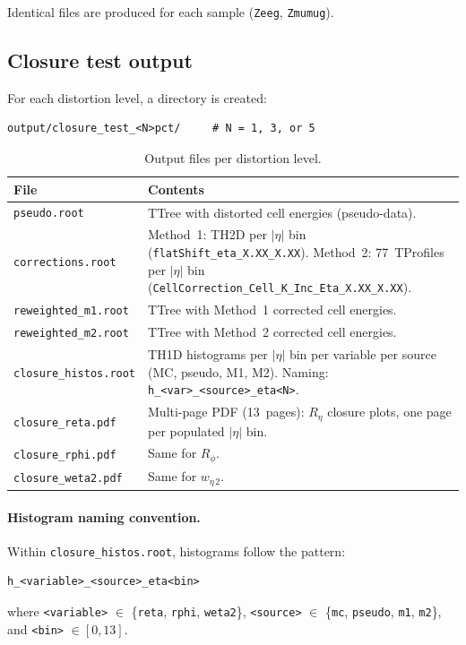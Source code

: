 \documentclass[12pt,a4paper]{article}
\begin{document}
Identical files are produced for each sample (\texttt{Zeeg},
\texttt{Zmumug}).

\subsection{Closure test output}

For each distortion level, a directory is created:

\begin{lstlisting}
output/closure_test_<N>pct/     # N = 1, 3, or 5
\end{lstlisting}

\begin{table}[htbp]
\centering
\caption{Output files per distortion level.}
\label{tab:output:closure}
\small
\begin{tabular}{lp{8cm}}
\toprule
\textbf{File} & \textbf{Contents} \\
\midrule
\texttt{pseudo.root}
  & TTree with distorted cell energies (pseudo-data). \\
\texttt{corrections.root}
  & Method~1: TH2D per $|\eta|$ bin
    (\texttt{flatShift\_eta\_X.XX\_X.XX}).
    Method~2: 77~TProfiles per $|\eta|$ bin
    (\texttt{CellCorrection\_Cell\_K\_Inc\_Eta\_X.XX\_X.XX}). \\
\texttt{reweighted\_m1.root}
  & TTree with Method~1 corrected cell energies. \\
\texttt{reweighted\_m2.root}
  & TTree with Method~2 corrected cell energies. \\
\texttt{closure\_histos.root}
  & TH1D histograms per $|\eta|$ bin per variable per source
    (MC, pseudo, M1, M2). Naming:
    \texttt{h\_<var>\_<source>\_eta<N>}. \\
\texttt{closure\_reta.pdf}
  & Multi-page PDF (13~pages): $R_\eta$ closure plots,
    one page per populated $|\eta|$ bin. \\
\texttt{closure\_rphi.pdf}
  & Same for $R_\phi$. \\
\texttt{closure\_weta2.pdf}
  & Same for $w_{\eta\,2}$. \\
\bottomrule
\end{tabular}
\end{table}

\paragraph{Histogram naming convention.}
Within \texttt{closure\_histos.root}, histograms follow the pattern:
\begin{lstlisting}
h_<variable>_<source>_eta<bin>
\end{lstlisting}
where \texttt{<variable>} $\in$ \{\texttt{reta}, \texttt{rphi},
\texttt{weta2}\}, \texttt{<source>} $\in$ \{\texttt{mc},
\texttt{pseudo}, \texttt{m1}, \texttt{m2}\}, and
\texttt{<bin>} $\in [0, 13]$.
\end{document}
